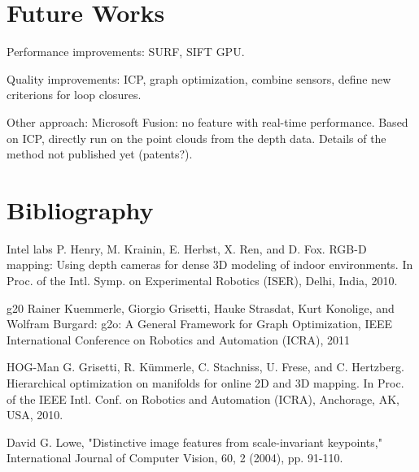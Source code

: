 \documentclass[a4paper,11pt]{kth-mag}
\begin{document}
\chapter{Future Works}

Performance improvements: SURF, SIFT GPU.

Quality improvements: ICP, graph optimization, combine sensors, define new criterions for loop closures.

Other approach:
Microsoft Fusion: no feature with real-time performance. Based on ICP, directly run on the point clouds from the depth data. Details of the method not published yet (patents?).

\chapter{Bibliography}

Intel labs
P. Henry, M. Krainin, E. Herbst, X. Ren, and D. Fox. RGB-D mapping:
Using depth cameras for dense 3D modeling of indoor environments.
In Proc. of the Intl. Symp. on Experimental Robotics (ISER), Delhi,
India, 2010.

g20
Rainer Kuemmerle, Giorgio Grisetti, Hauke Strasdat, Kurt Konolige, and Wolfram Burgard: g2o: A General Framework for Graph Optimization, IEEE International Conference on Robotics and Automation (ICRA), 2011

HOG-Man
G. Grisetti, R. K\"ummerle, C. Stachniss, U. Frese, and C. Hertzberg.
Hierarchical optimization on manifolds for online 2D and 3D mapping.
In Proc. of the IEEE Intl. Conf. on Robotics and Automation (ICRA),
Anchorage, AK, USA, 2010.

David G. Lowe, "Distinctive image features from scale-invariant keypoints," International Journal of Computer Vision, 60, 2 (2004), pp. 91-110.
\end{document}
